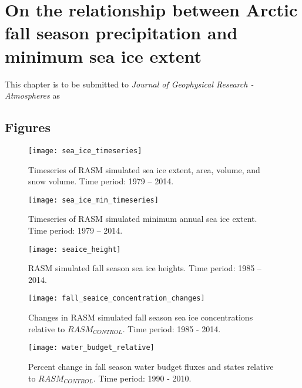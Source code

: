 \chapter{On the relationship between Arctic fall season precipitation and minimum sea ice extent}
\label{chap:fall_prec_sup}

This chapter is to be submitted to \textit{Journal of Geophysical Research - Atmospheres} as


\section{Figures}

\begin{figure}
    \centering
    \texttt{[image: sea\_ice\_timeseries]}
    \caption{Timeseries of RASM simulated sea ice extent, area, volume, and snow volume. Time period: 1979 – 2014.}
    \label{fig:sea_ice_ts_sup}
\end{figure}

\begin{figure}
    \centering
    \texttt{[image: sea\_ice\_min\_timeseries]}
    \caption{Timeseries of RASM simulated minimum annual sea ice extent. Time period: 1979 – 2014.}
    \label{fig:sea_ice_min_ts_sup}
\end{figure}

\begin{figure}
    \centering
    \texttt{[image: seaice\_height]}
    \caption{RASM simulated fall season sea ice heights. Time period: 1985 – 2014.}
    \label{fig:sea_ice_height_sup}
\end{figure}

\begin{figure}
    \centering
    \texttt{[image: fall\_seaice\_concentration\_changes]}
    \caption{Changes in RASM simulated fall season sea ice concentrations relative to $RASM_{CONTROL}$.
    Time period: 1985 - 2014.}
    \label{fig:sea_ice_conc_sup}
\end{figure}

\begin{figure}
    \centering
    \texttt{[image: water\_budget\_relative]}
    \caption{Percent change in fall season water budget fluxes and states relative to $RASM_{CONTROL}$.
    Time period: 1990 - 2010.}
    \label{fig:relative_fwb_change_sup}
\end{figure}

